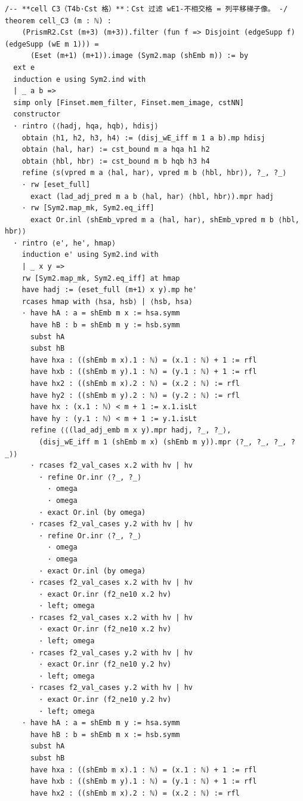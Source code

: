 \documentclass[11pt]{article}
\begin{document}
\begin{lstlisting}
/-- **cell C3（T4b·Cst 格）**：Cst 过滤 wE1-不相交格 = 列平移梯子像。 -/
theorem cell_C3 (m : ℕ) :
    (PrismR2.Cst (m+3) (m+3)).filter (fun f => Disjoint (edgeSupp f) (edgeSupp (wE m 1))) =
      (Eset (m+1) (m+1)).image (Sym2.map (shEmb m)) := by
  ext e
  induction e using Sym2.ind with
  | _ a b =>
  simp only [Finset.mem_filter, Finset.mem_image, cstNN]
  constructor
  · rintro ⟨⟨hadj, hqa, hqb⟩, hdisj⟩
    obtain ⟨h1, h2, h3, h4⟩ := (disj_wE_iff m 1 a b).mp hdisj
    obtain ⟨hal, har⟩ := cst_bound m a hqa h1 h2
    obtain ⟨hbl, hbr⟩ := cst_bound m b hqb h3 h4
    refine ⟨s(vpred m a ⟨hal, har⟩, vpred m b ⟨hbl, hbr⟩), ?_, ?_⟩
    · rw [eset_full]
      exact (lad_adj_pred m a b ⟨hal, har⟩ ⟨hbl, hbr⟩).mpr hadj
    · rw [Sym2.map_mk, Sym2.eq_iff]
      exact Or.inl ⟨shEmb_vpred m a ⟨hal, har⟩, shEmb_vpred m b ⟨hbl, hbr⟩⟩
  · rintro ⟨e', he', hmap⟩
    induction e' using Sym2.ind with
    | _ x y =>
    rw [Sym2.map_mk, Sym2.eq_iff] at hmap
    have hadj := (eset_full (m+1) x y).mp he'
    rcases hmap with ⟨hsa, hsb⟩ | ⟨hsb, hsa⟩
    · have hA : a = shEmb m x := hsa.symm
      have hB : b = shEmb m y := hsb.symm
      subst hA
      subst hB
      have hxa : ((shEmb m x).1 : ℕ) = (x.1 : ℕ) + 1 := rfl
      have hxb : ((shEmb m y).1 : ℕ) = (y.1 : ℕ) + 1 := rfl
      have hx2 : ((shEmb m x).2 : ℕ) = (x.2 : ℕ) := rfl
      have hy2 : ((shEmb m y).2 : ℕ) = (y.2 : ℕ) := rfl
      have hx : (x.1 : ℕ) < m + 1 := x.1.isLt
      have hy : (y.1 : ℕ) < m + 1 := y.1.isLt
      refine ⟨⟨(lad_adj_emb m x y).mpr hadj, ?_, ?_⟩,
        (disj_wE_iff m 1 (shEmb m x) (shEmb m y)).mpr ⟨?_, ?_, ?_, ?_⟩⟩
      · rcases f2_val_cases x.2 with hv | hv
        · refine Or.inr ⟨?_, ?_⟩
          · omega
          · omega
        · exact Or.inl (by omega)
      · rcases f2_val_cases y.2 with hv | hv
        · refine Or.inr ⟨?_, ?_⟩
          · omega
          · omega
        · exact Or.inl (by omega)
      · rcases f2_val_cases x.2 with hv | hv
        · exact Or.inr (f2_ne10 x.2 hv)
        · left; omega
      · rcases f2_val_cases x.2 with hv | hv
        · exact Or.inr (f2_ne10 x.2 hv)
        · left; omega
      · rcases f2_val_cases y.2 with hv | hv
        · exact Or.inr (f2_ne10 y.2 hv)
        · left; omega
      · rcases f2_val_cases y.2 with hv | hv
        · exact Or.inr (f2_ne10 y.2 hv)
        · left; omega
    · have hA : a = shEmb m y := hsa.symm
      have hB : b = shEmb m x := hsb.symm
      subst hA
      subst hB
      have hxa : ((shEmb m x).1 : ℕ) = (x.1 : ℕ) + 1 := rfl
      have hxb : ((shEmb m y).1 : ℕ) = (y.1 : ℕ) + 1 := rfl
      have hx2 : ((shEmb m x).2 : ℕ) = (x.2 : ℕ) := rfl

\end{lstlisting}
\end{document}
